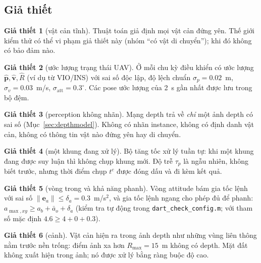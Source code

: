 \documentclass[11pt,a4paper]{article}
\numberwithin{equation}{section}
\newcommand{\vb}[1]{\bm{#1}}
\newcommand{\code}[1]{\texttt{\small #1}}
\theoremstyle{definition}
\newtheorem{assumption}{Giả thiết}
\theoremstyle{plain}
\theoremstyle{remark}
\begin{document}
\subsection{Giả thiết}
\begin{assumption}[vật cản tĩnh]\label{as:static}
Thuật toán giả định mọi vật cản đứng yên. Thế giới kiểm thử có thể vi phạm giả thiết này (nhóm ``có vật di chuyển''); khi đó không có bảo đảm nào.
\end{assumption}
\begin{assumption}[ước lượng trạng thái UAV]\label{as:est}
Ở mỗi chu kỳ điều khiển có ước lượng $\hat{\vb p},\hat{\vb v},\hat R$ (ví dụ từ VIO/INS) với sai số độc lập, độ lệch chuẩn $\sigma_p=0.02$~m, $\sigma_v=0.03$~m/s, $\sigma_{\text{att}}=0.3^\circ$. Các pose ước lượng của 2~s gần nhất được lưu trong bộ đệm.
\end{assumption}
\begin{assumption}[perception không nhãn]\label{as:nolabel}
Mạng depth trả về \emph{chỉ} một ảnh depth có sai số (Mục~\ref{sec:depthmodel}). Không có nhãn instance, không có định danh vật cản, không có thông tin vật nào đứng yên hay di chuyển.
\end{assumption}
\begin{assumption}[một khung đang xử lý]\label{as:onejob}
Bộ tăng tốc xử lý tuần tự: khi một khung đang được suy luận thì không chụp khung mới. Độ trễ $\tau_p$ là ngẫu nhiên, không biết trước, nhưng thời điểm chụp $t^c$ được đóng dấu và đi kèm kết quả.
\end{assumption}
\begin{assumption}[vòng trong và khả năng phanh]\label{as:inner}
Vòng attitude bám gia tốc lệnh với sai số $\|\vb e_a\|\le\delta_a=0.3$~m/s$^2$, và gia tốc lệnh ngang cho phép đủ để phanh: $a_{\max,xy}\ge a_b+\bar a_o+\delta_a$ (kiểm tra tự động trong \code{dart\_check\_config.m}; với tham số mặc định $4.6\ge4+0+0.3$).
\end{assumption}
\begin{assumption}[cảnh]\label{as:scene}
Vật cản hiện ra trong ảnh depth như những vùng liên thông nằm trước nền trống: điểm ảnh xa hơn $R_{\max}=15$~m không có depth. Mặt đất không xuất hiện trong ảnh; nó được xử lý bằng ràng buộc độ cao.
\end{assumption}
\end{document}
